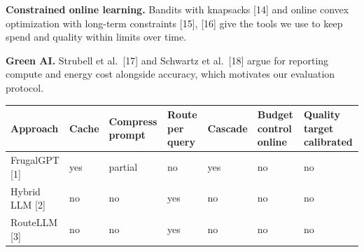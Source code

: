 \documentclass[
  10pt,
]{article}
\newcounter{none} %
\begin{document}
\textbf{Constrained online learning.} Bandits with knapsacks {[}14{]}
and online convex optimization with long-term constraints {[}15{]},
{[}16{]} give the tools we use to keep spend and quality within limits
over time.

\textbf{Green AI.} Strubell et al.~{[}17{]} and Schwartz et al.~{[}18{]}
argue for reporting compute and energy cost alongside accuracy, which
motivates our evaluation protocol.

{\def\LTcaptype{none} %
\begin{longtable}[]{@{}
  >{\raggedright\arraybackslash}p{}
  >{\raggedright\arraybackslash}p{}
  >{\raggedright\arraybackslash}p{}
  >{\raggedright\arraybackslash}p{}
  >{\raggedright\arraybackslash}p{}
  >{\raggedright\arraybackslash}p{}
  >{\raggedright\arraybackslash}p{}@{}}
\toprule\noalign{}
\begin{minipage}[b]{\linewidth}\raggedright
Approach
\end{minipage} & \begin{minipage}[b]{\linewidth}\raggedright
Cache
\end{minipage} & \begin{minipage}[b]{\linewidth}\raggedright
Compress prompt
\end{minipage} & \begin{minipage}[b]{\linewidth}\raggedright
Route per query
\end{minipage} & \begin{minipage}[b]{\linewidth}\raggedright
Cascade
\end{minipage} & \begin{minipage}[b]{\linewidth}\raggedright
Budget control online
\end{minipage} & \begin{minipage}[b]{\linewidth}\raggedright
Quality target calibrated
\end{minipage} \\
\midrule\noalign{}
\endhead
\bottomrule\noalign{}
\endlastfoot
FrugalGPT {[}1{]} & yes & partial & no & yes & no & no \\
Hybrid LLM {[}2{]} & no & no & yes & no & no & no \\
RouteLLM {[}3{]} & no & no & yes & no & no & no \\

\end{longtable}}
\end{document}

